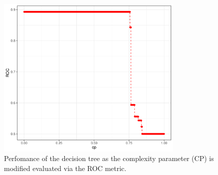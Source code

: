 \documentclass[
12pt, %
a4paper, %
oneside, %
headinclude,footinclude, %
BCOR5mm, %
]{scrartcl}
\begin{document}
\begin{figure}[h]
\begin{center}
\includegraphics[width=0.8\textwidth]{Pic/cp_vs_ROC.pdf}
\caption{Perfomance of the decision tree as the complexity parameter (CP) is modified evaluated via the ROC metric. }
\label{cp_vs_ROC}
\end{center}
\end{figure}
\end{document}
